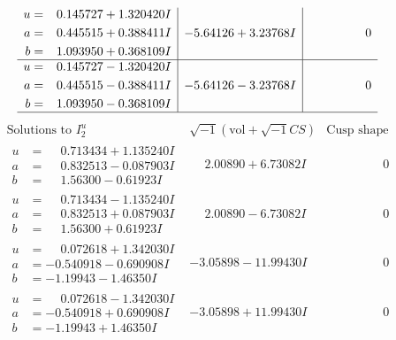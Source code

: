 \documentclass[1p]{elsarticle_modified}
\theoremstyle{definition}
\newcommand{\I}{\sqrt{-1}}
\begin{document}
$$\begin{array}{c|c|c}
\begin{aligned}
u &= \phantom{-}0.145727 + 1.320420 I \\
a &= \phantom{-}0.445515 + 0.388411 I \\
b &= \phantom{-}1.093950 + 0.368109 I\end{aligned}
 & -5.64126 + 3.23768 I & \phantom{-0.000000 } 0 \\ \hline\begin{aligned}
u &= \phantom{-}0.145727 - 1.320420 I \\
a &= \phantom{-}0.445515 - 0.388411 I \\
b &= \phantom{-}1.093950 - 0.368109 I\end{aligned}
 & -5.64126 - 3.23768 I & \phantom{-0.000000 } 0\\
 \hline 
 \end{array}$$\newpage$$\begin{array}{c|c|c}  
\text{Solutions to }I^u_{2}& \I (\text{vol} + \sqrt{-1}CS) & \text{Cusp shape}\\
 \hline 
\begin{aligned}
u &= \phantom{-}0.713434 + 1.135240 I \\
a &= \phantom{-}0.832513 - 0.087903 I \\
b &= \phantom{-}1.56300 - 0.61923 I\end{aligned}
 & \phantom{-}2.00890 + 6.73082 I & \phantom{-0.000000 } 0 \\ \hline\begin{aligned}
u &= \phantom{-}0.713434 - 1.135240 I \\
a &= \phantom{-}0.832513 + 0.087903 I \\
b &= \phantom{-}1.56300 + 0.61923 I\end{aligned}
 & \phantom{-}2.00890 - 6.73082 I & \phantom{-0.000000 } 0 \\ \hline\begin{aligned}
u &= \phantom{-}0.072618 + 1.342030 I \\
a &= -0.540918 - 0.690908 I \\
b &= -1.19943 - 1.46350 I\end{aligned}
 & -3.05898 - 11.99430 I & \phantom{-0.000000 } 0 \\ \hline\begin{aligned}
u &= \phantom{-}0.072618 - 1.342030 I \\
a &= -0.540918 + 0.690908 I \\
b &= -1.19943 + 1.46350 I\end{aligned}
 & -3.05898 + 11.99430 I & \phantom{-0.000000 } 0 \\ \hline\begin{aligned}

\end{aligned}
\end{array}$$
\end{document}
